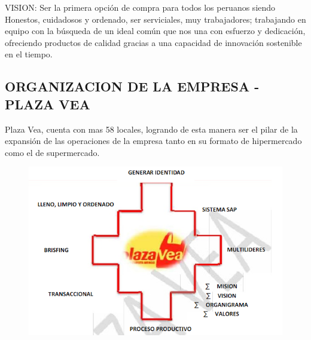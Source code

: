 VISION:
Ser la primera opción de compra para todos los peruanos siendo Honestos, cuidadosos y ordenado, ser serviciales, muy trabajadores; trabajando en equipo con la búsqueda de un ideal común que nos una con esfuerzo y dedicación, ofreciendo productos de calidad gracias a una capacidad de innovación sostenible en el tiempo. 

\subsection{ ORGANIZACION  DE LA EMPRESA - PLAZA VEA}

Plaza Vea, cuenta con mas 58 locales, logrando de esta manera ser el pilar de la expansión de las operaciones de la empresa tanto en su formato de hipermercado como el de supermercado.

				\begin{figure}[htb]
				\begin{center}
					\includegraphics[width=15cm]{./Imagenes/4}
				\end{center}
			\end{figure}



